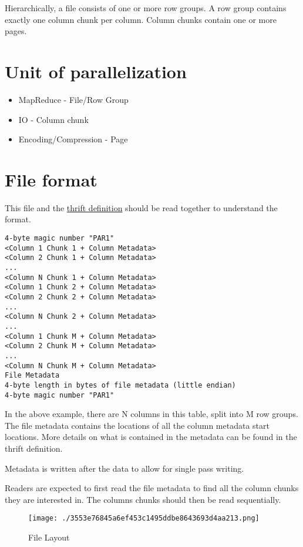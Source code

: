 \documentclass[a4paper,12pt,notitlepage,twoside,openright]{article}
\begin{document}
Hierarchically, a file consists of one or more row groups. A row group
contains exactly one column chunk per column. Column chunks contain one
or more pages.

\hypertarget{unit-of-parallelization}{%
\section{Unit of parallelization}\label{unit-of-parallelization}}

\begin{itemize}

\item
  MapReduce - File/Row Group
\item
  IO - Column chunk
\item
  Encoding/Compression - Page
\end{itemize}

\hypertarget{file-format}{%
\section{File format}\label{file-format}}

This file and the \href{src/main/thrift/parquet.thrift}{thrift
definition} should be read together to understand the format.

\begin{verbatim}
4-byte magic number "PAR1"
<Column 1 Chunk 1 + Column Metadata>
<Column 2 Chunk 1 + Column Metadata>
...
<Column N Chunk 1 + Column Metadata>
<Column 1 Chunk 2 + Column Metadata>
<Column 2 Chunk 2 + Column Metadata>
...
<Column N Chunk 2 + Column Metadata>
...
<Column 1 Chunk M + Column Metadata>
<Column 2 Chunk M + Column Metadata>
...
<Column N Chunk M + Column Metadata>
File Metadata
4-byte length in bytes of file metadata (little endian)
4-byte magic number "PAR1"
\end{verbatim}

In the above example, there are N columns in this table, split into M
row groups. The file metadata contains the locations of all the column
metadata start locations. More details on what is contained in the
metadata can be found in the thrift definition.

Metadata is written after the data to allow for single pass writing.

Readers are expected to first read the file metadata to find all the
column chunks they are interested in. The columns chunks should then be
read sequentially.

\begin{figure}
\centering
\texttt{[image: ./3553e76845a6ef453c1495ddbe8643693d4aa213.png]}
\caption{File Layout}
\end{figure}
\end{document}
